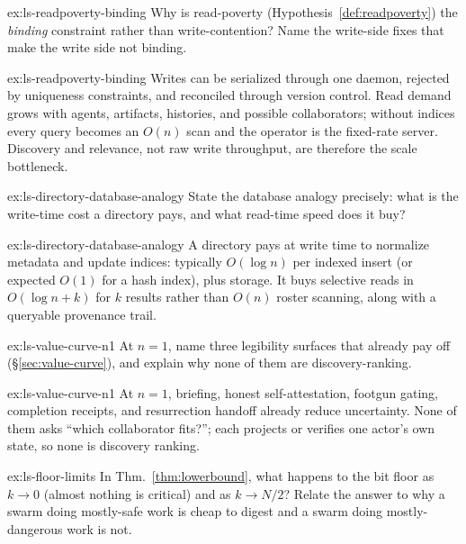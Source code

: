 \documentclass[11pt,a4paper]{article}
\theoremstyle{definition}
\theoremstyle{plain}
\begin{document}
\begin{pdexercise}[kind=Check,rating=1]{ex:ls-readpoverty-binding}
Why is read-poverty (Hypothesis~\ref{def:readpoverty}) the \emph{binding} constraint
rather than write-contention? Name the write-side fixes that make the
write side not binding.
\end{pdexercise}
\begin{pdsolution}{ex:ls-readpoverty-binding}
Writes can be serialized through one daemon, rejected by uniqueness constraints, and reconciled through version control. Read demand grows with agents, artifacts, histories, and possible collaborators; without indices every query becomes an $O(n)$ scan and the operator is the fixed-rate server. Discovery and relevance, not raw write throughput, are therefore the scale bottleneck.
\end{pdsolution}
\begin{pdexercise}[kind=Check,rating=1]{ex:ls-directory-database-analogy}
State the database analogy precisely: what is the
write-time cost a directory pays, and what read-time speed does it buy?
\end{pdexercise}
\begin{pdsolution}{ex:ls-directory-database-analogy}
A directory pays at write time to normalize metadata and update indices: typically $O(\log n)$ per indexed insert (or expected $O(1)$ for a hash index), plus storage. It buys selective reads in $O(\log n+k)$ for $k$ results rather than $O(n)$ roster scanning, along with a queryable provenance trail.
\end{pdsolution}
\begin{pdexercise}[kind=Trace,rating=2]{ex:ls-value-curve-n1}
At $n{=}1$, name three legibility surfaces that already pay off
(\S\ref{sec:value-curve}), and explain why none of them are discovery-ranking.
\end{pdexercise}
\begin{pdsolution}{ex:ls-value-curve-n1}
At $n{=}1$, briefing, honest self-attestation, footgun gating, completion receipts, and resurrection handoff already reduce uncertainty. None of them asks ``which collaborator fits?''; each projects or verifies one actor's own state, so none is discovery ranking.
\end{pdsolution}
\begin{pdexercise}[kind=Trace,rating=2]{ex:ls-floor-limits}
In Thm.~\ref{thm:lowerbound}, what happens to the bit floor as $k\to 0$ (almost
nothing is critical) and as $k\to N/2$? Relate the answer to why a swarm doing
mostly-safe work is cheap to digest and a swarm doing mostly-dangerous work is not.
\end{pdexercise}
\end{document}

